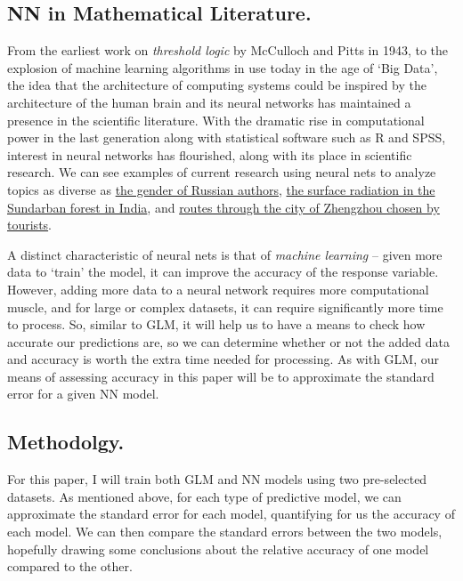 \documentclass[12pt]{article}
\begin{document}
	\subsection{NN in Mathematical Literature.}
		From the earliest work on \textit{threshold logic} by McCulloch and Pitts in 1943, to the explosion of machine learning algorithms
in use today in the age of `Big Data', the idea that the architecture of computing systems could be inspired by the architecture of the human brain
and its neural networks has maintained a presence in the scientific literature.  With the dramatic rise in computational power in the last 
generation along with statistical software such as R and SPSS, interest in neural networks has flourished, along with its place in scientific
research.  We can see examples of current research using neural nets to analyze topics as diverse as 
\href{https://www.sciencedirect.com/science/article/pii/S1877050918300656}{the gender of Russian authors},
\href{https://www.sciencedirect.com/science/article/pii/S2468203916300024}{the surface radiation in the Sundarban forest in India}, and 
\href{https://www.sciencedirect.com/science/article/pii/S1877050917303617}{routes through the city of Zhengzhou chosen by tourists}.
		
A distinct characteristic of neural nets is that of \textit{machine learning} -- given more data to `train' the model, it can improve the accuracy
of the response variable.  However, adding more data to a neural network requires more computational muscle, and for large or complex datasets,
it can require significantly more time to process.  So, similar to GLM, it will help us to have a means to check how accurate our predictions are,
so we can determine whether or not the added data and accuracy is worth the extra time needed for processing.  As with GLM, our means of assessing
accuracy in this paper will be to approximate the standard error for a given NN model.


	\subsection{Methodolgy.}
		For this paper, I will train both GLM and NN models using two pre-selected datasets.  As mentioned above, for each type of
predictive model, we can approximate the standard error for each model, quantifying for us the accuracy of each model.  We can then compare the 
standard errors between the two models, hopefully drawing some conclusions about the relative accuracy of one model compared to the other.
\end{document}
